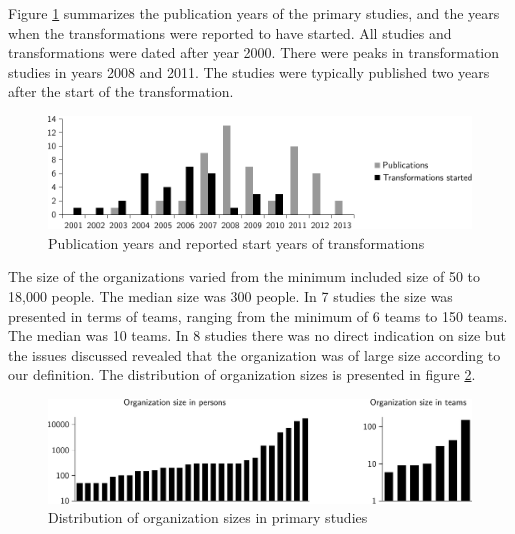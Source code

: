\documentclass[preprint,authoryear,12pt]{elsarticle}
\begin{document}
Figure \ref{fig:transformation_time} summarizes the publication years of the
primary studies, and the years when the transformations were reported to have
started. All studies and transformations were dated after year 2000. There were
peaks in transformation studies in years 2008 and 2011. The studies were
typically published two years after the start of the transformation.

\begin{figure}[b]
  \begin{center}
    \includegraphics[width=1\textwidth]{graphics/transformation_time.pdf}
    \caption{Publication years and reported start years of transformations}
    \label{fig:transformation_time}
  \end{center}
\end{figure}

The size of the organizations varied from the minimum included size of 50 to
18,000 people. The median size was 300 people. In 7 studies the size was
presented in terms of teams, ranging from the minimum of 6 teams to 150 teams.
The median was 10 teams. In 8 studies there was no direct indication on size
but the issues discussed revealed that the organization was of large size
according to our definition. The distribution of organization sizes is presented
in figure \ref{fig:organization_size}.

\begin{figure}[!t]
  \begin{center}
    \includegraphics[width=1\textwidth]{graphics/organization_size.pdf}
    \caption{Distribution of organization sizes in primary studies}
    \label{fig:organization_size}
  \end{center}
\end{figure}
\end{document}
